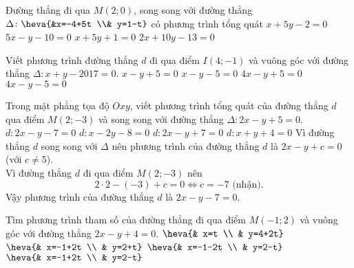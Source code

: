 	\begin{ex}%
		Đường thẳng đi qua $M(2;0)$, song song với đường thẳng $\Delta \colon \heva{&x=-4+5t \\& y=1-t}$ có phương trình tổng quát
		\choice
		{\True $x+5y-2=0$}
		{$5x-y-10=0$}
		{$x+5y+1=0$}
		{$2x+10y-13=0$}
	\end{ex}
	\begin{ex}%
		Viết phương trình đường thẳng $d$ đi qua điểm $I(4;-1)$ và vuông góc với đường thẳng $\Delta \colon x+y-2017=0$.
		\choice
		{$x-y+5=0$}
		{\True $x-y-5=0$}
		{$4x-y+5=0$}
		{$4x-y-5=0$}
	\end{ex}
	\begin{ex}%
		Trong mặt phẳng tọa độ $Oxy$, viết phương trình tổng quát của đường thẳng $d$ qua điểm $M(2;-3)$ và song song với đường thẳng $\Delta \colon 2x-y+5=0$.
		\choice
		{\True $d \colon 2x-y-7=0$}
		{$d \colon x-2y-8=0$}
		{$d \colon 2x-y+7=0$}
		{$d \colon x+y+4=0$}
		\loigiai
		{
			Vì đường thẳng $d$ song song với $\Delta$ nên phương trình của đường thẳng $d$ là $2x-y+c=0$ (với $c\neq 5$).\\
			Vì đường thẳng $d$ đi qua điểm $M(2;-3)$ nên
			\[2\cdot 2-(-3)+c=0 \Leftrightarrow c=-7 \text{ (nhận)}.\]
			Vậy phương trình của đường thẳng $d$ là $2x-y-7=0$.
		}
	\end{ex}
	\begin{ex}%
		Tìm phương trình tham số của đường thẳng đi qua điểm $M(-1;2)$ và vuông góc với đường thẳng $2x-y+4=0$.
		\choice
		{$\heva{& x=t \\ & y=4+2t} $}
		{$ \heva{& x=-1+2t \\ & y=2+t}$}
		{$\heva{& x=-1-2t \\ & y=2-t} $}
		{\True $\heva{& x=-1+2t \\ & y=2-t}$}
	\end{ex}
